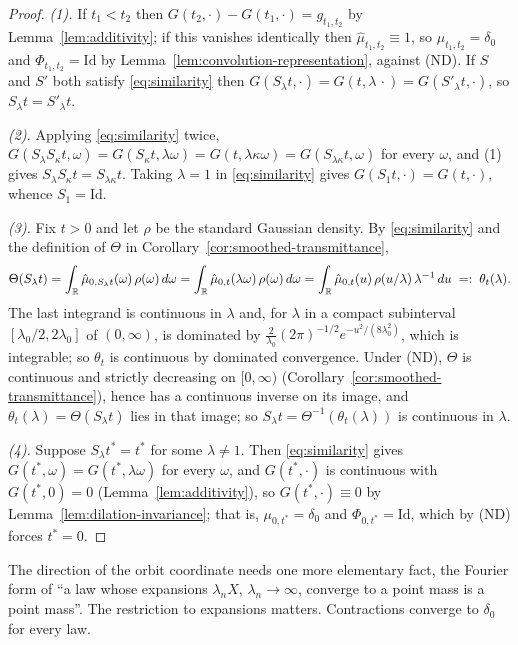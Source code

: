 \begin{proof}
\emph{(1).} If $t_1 < t_2$ then $G(t_2,\cdot) - G(t_1,\cdot) = g_{t_1,t_2}$ by
Lemma~\ref{lem:additivity}; if this vanishes identically then $\hat\mu_{t_1,t_2} \equiv 1$, so
$\mu_{t_1,t_2} = \delta_0$ and $\Phi_{t_1,t_2} = \mathrm{Id}$ by
Lemma~\ref{lem:convolution-representation}, against (ND). If $S$ and $S'$ both satisfy
\ref{eq:similarity} then $G(S_\lambda t,\cdot) = G(t,\lambda\,\cdot) = G(S'_\lambda t,\cdot)$,
so $S_\lambda t = S'_\lambda t$.

\emph{(2).} Applying \ref{eq:similarity} twice,
$G(S_\lambda S_\kappa t,\omega) = G(S_\kappa t,\lambda\omega) = G(t,\lambda\kappa\omega)
= G(S_{\lambda\kappa}t,\omega)$ for every $\omega$, and (1) gives
$S_\lambda S_\kappa t = S_{\lambda\kappa}t$. Taking $\lambda = 1$ in \ref{eq:similarity} gives
$G(S_1t,\cdot) = G(t,\cdot)$, whence $S_1 = \mathrm{Id}$.

\emph{(3).} Fix $t > 0$ and let $\rho$ be the standard Gaussian density. By
\ref{eq:similarity} and the definition of $\Theta$ in
Corollary~\ref{cor:smoothed-transmittance},
\[
  \Theta(S_\lambda t)
  = \int_{\mathbb{R}} \hat\mu_{0,S_\lambda t}(\omega)\,\rho(\omega)\,d\omega
  = \int_{\mathbb{R}} \hat\mu_{0,t}(\lambda\omega)\,\rho(\omega)\,d\omega
  = \int_{\mathbb{R}} \hat\mu_{0,t}(u)\,\rho(u/\lambda)\,\lambda^{-1}\,du \;=:\; \theta_t(\lambda).
\]
The last integrand is continuous in $\lambda$ and, for $\lambda$ in a compact subinterval
$[\lambda_0/2, 2\lambda_0]$ of $(0,\infty)$, is dominated by
$\tfrac{2}{\lambda_0}(2\pi)^{-1/2}e^{-u^2/(8\lambda_0^2)}$, which is integrable; so $\theta_t$
is continuous by dominated convergence. Under (ND), $\Theta$ is continuous and strictly
decreasing on $[0,\infty)$ (Corollary~\ref{cor:smoothed-transmittance}), hence has a
continuous inverse on its image, and $\theta_t(\lambda) = \Theta(S_\lambda t)$ lies in that
image; so $S_\lambda t = \Theta^{-1}(\theta_t(\lambda))$ is continuous in $\lambda$.

\emph{(4).} Suppose $S_\lambda t^* = t^*$ for some $\lambda \ne 1$. Then \ref{eq:similarity}
gives $G(t^*,\omega) = G(t^*,\lambda\omega)$ for every $\omega$, and $G(t^*,\cdot)$ is
continuous with $G(t^*,0) = 0$ (Lemma~\ref{lem:additivity}), so $G(t^*,\cdot) \equiv 0$ by
Lemma~\ref{lem:dilation-invariance}; that is, $\mu_{0,t^*} = \delta_0$ and
$\Phi_{0,t^*} = \mathrm{Id}$, which by (ND) forces $t^* = 0$.
\end{proof}

The direction of the orbit coordinate needs one more elementary fact, the Fourier form of ``a
law whose expansions $\lambda_n X$, $\lambda_n \to \infty$, converge to a point mass is a point
mass''. The restriction to expansions matters. Contractions converge to $\delta_0$ for every
law.

